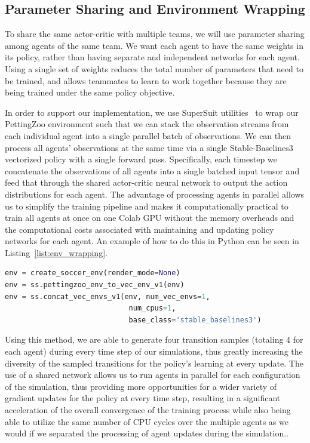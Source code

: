 \subsection{Parameter Sharing and Environment Wrapping}

To share the same actor-critic with multiple teams, we will use parameter sharing among agents of the same team. We want each agent to have the same weights in its policy, rather than having separate and independent networks for each agent. Using a single set of weights reduces the total number of parameters that need to be trained, and allows teammates to learn to work together because they are being trained under the same policy objective.

In order to support our implementation, we use SuperSuit utilities~\citep{supersuit2021} to wrap our PettingZoo environment such that we can stack the observation streams from each individual agent into a single parallel batch of observations. We can then process all agents' observations at the same time via a single Stable-Baselines3 vectorized policy with a single forward pass. Specifically, each timestep we concatenate the observations of all agents into a single batched input tensor and feed that through the shared actor-critic neural network to output the action distributions for each agent. The advantage of processing agents in parallel allows us to simplify the training pipeline and makes it computationally practical to train all agents at once on one Colab GPU without the memory overheads and the computational costs associated with maintaining and updating policy networks for each agent. An example of how to do this in Python can be seen in Listing~\ref{list:env_wrapping}.

\begin{lstlisting}[language=Python, 
    caption={Environment wrapping for parameter sharing.}, 
    label=list:env_wrapping]
env = create_soccer_env(render_mode=None)
env = ss.pettingzoo_env_to_vec_env_v1(env)
env = ss.concat_vec_envs_v1(env, num_vec_envs=1, 
                             num_cpus=1, 
                             base_class='stable_baselines3')
\end{lstlisting}

Using this method, we are able to generate four transition samples (totaling 4 for each agent) during every time step of our simulations, thus greatly increasing the diversity of the sampled transitions for the policy's learning at every update. The use of a shared network allows us to run agents in parallel for each configuration of the simulation, thus providing more opportunities for a wider variety of gradient updates for the policy at every time step, resulting in a significant acceleration of the overall convergence of the training process while also being able to utilize the same number of CPU cycles over the multiple agents as we would if we separated the processing of agent updates during the simulation..

